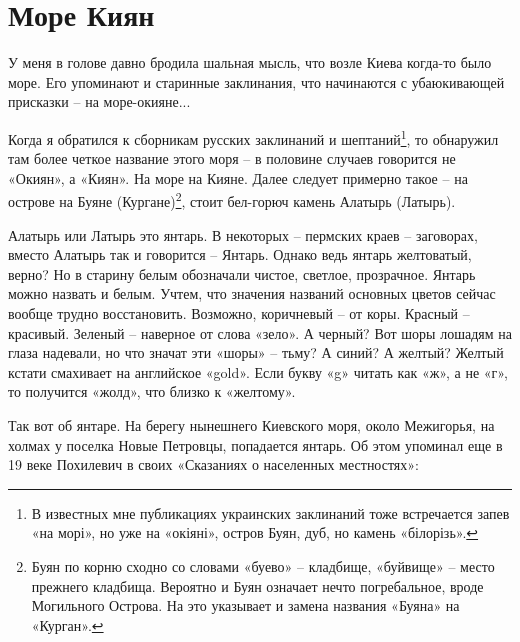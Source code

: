 \chapter{Море Киян}

У меня в голове давно бродила шальная мысль, что возле Киева когда-то было море. Его упоминают и  старинные заклинания, что начинаются с убаюкивающей присказки – на море-окияне...

Когда я обратился к сборникам русских заклинаний и шептаний\footnote{В известных мне публикациях украинских заклинаний тоже встречается запев «на морі», но уже на «окіяні», остров Буян, дуб, но камень «білорізь».}, то обнаружил там более четкое название этого моря – в половине случаев говорится не «Окиян», а «Киян». На море на Кияне. Далее следует примерно такое – на острове на Буяне (Кургане)\footnote{Буян по корню сходно со словами «буево» – кладбище, «буйвище» – место прежнего кладбища. Вероятно и Буян означает нечто погребальное, вроде Могильного Острова. На это указывает и замена названия «Буяна» на «Курган».}, стоит бел-горюч камень Алатырь (Латырь). 

Алатырь или Латырь это янтарь. В некоторых – пермских краев – заговорах, вместо Алатырь так и говорится – Янтарь. Однако ведь янтарь желтоватый, верно? Но в старину белым обозначали чистое, светлое, прозрачное. Янтарь можно назвать и белым. Учтем, что значения названий основных цветов сейчас вообще трудно восстановить. Возможно, коричневый – от коры. Красный – красивый. Зеленый – наверное от слова «зело». А черный? Вот шоры лошадям на глаза надевали, но что значат эти «шоры» – тьму? А синий? А желтый? Желтый кстати смахивает на английское «gold». Если букву «g» читать как «ж», а не «г», то получится «жолд», что близко к «желтому».

Так вот об янтаре. На берегу нынешнего Киевского моря, около Межигорья, на холмах у поселка Новые Петровцы, попадается янтарь. Об этом упоминал еще в 19 веке Похилевич в своих «Сказаниях о населенных местностях»:

